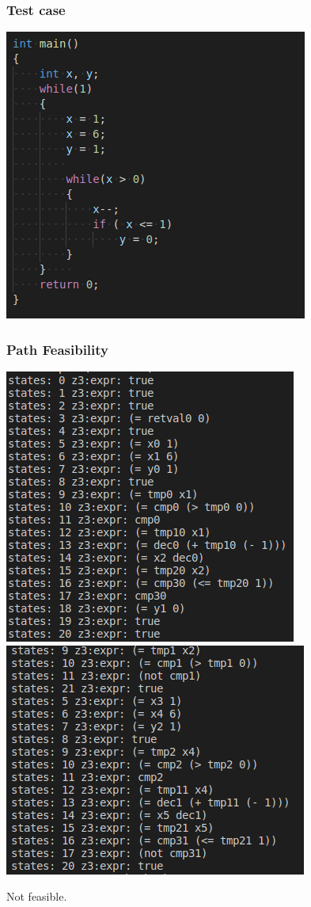 \documentclass[11pt]{beamer}
\begin{document}
\begin{frame}\frametitle{Test case}
\begin{center}
\includegraphics[scale=0.6]{pro.png}
\end{center}
\end{frame}

\begin{frame}\frametitle{Path Feasibility}

\includegraphics[scale=0.4]{p1.png}
\includegraphics[scale=0.4]{p2.png}

Not feasible.
\end{frame}
\end{document}
